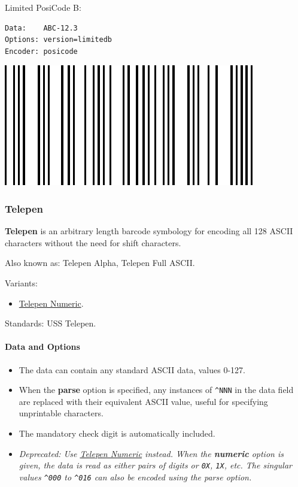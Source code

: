 Limited PosiCode B:

\begin{verbatim}
Data:    ABC-12.3
Options: version=limitedb
Encoder: posicode
\end{verbatim}

\includegraphics{images/posicode-6.eps}

\hypertarget{telepen}{%
\subsubsection{Telepen}\label{telepen}}

\textbf{Telepen} is an arbitrary length barcode symbology for encoding
all 128 ASCII characters without the need for shift characters.

Also known as: Telepen Alpha, Telepen Full ASCII.

Variants:

\begin{itemize}
\tightlist
\item
  \protect\hyperlink{telepen-numeric}{Telepen Numeric}.
\end{itemize}

Standards: USS Telepen.

\hypertarget{data-and-options-77}{%
\paragraph{Data and Options}\label{data-and-options-77}}

\begin{itemize}
\tightlist
\item
  The data can contain any standard ASCII data, values 0-127.
\item
  When the \textbf{parse} option is specified, any instances of
  \texttt{\^{}NNN} in the data field are replaced with their equivalent
  ASCII value, useful for specifying unprintable characters.
\item
  The mandatory check digit is automatically included.
\item
  \emph{Deprecated: Use \protect\hyperlink{telepen-numeric}{Telepen
  Numeric} instead. When the \textbf{numeric} option is given, the data
  is read as either pairs of digits or \texttt{0X}, \texttt{1X}, etc.
  The singular values \texttt{\^{}000} to \texttt{\^{}016} can also be
  encoded using the \emph{parse} option.}
\end{itemize}

